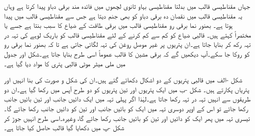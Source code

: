 جہاں مقناطیسی قالب میں بدلتا مقناطیسی بہاو ثانوی لچھوں میں فائدہ مند برقی دباو پیدا کرتا ہے وہاں یہ مقناطیسی قالب میں نقصان دہ برقی دباو کو بھی جنم دیتا ہے جس سے مقناطیسی قالب میں  پیدا ہوتا ہے۔ بھنور نما برقی رو مقناطیسی قالب میں برقی طاقت کے ضیاع کا سبب بنتا ہے جسے   یا  مختصراً  کہتے ہیں۔ قالبی ضیاع کو کم سے کم کرنے کے لئے مقناطیسی قالب کو  باریک لوہے کی  تہہ در تہہ رکھ کر بنایا جاتا ہے۔ان پتریوں پر غیر موصل روغن کی تہہ لگائی جاتی ہے تا کہ بھنور نما برقی رو کو روکا جا سکے۔آپ دیکھیں گے کہ برقی مشین کا قالب عموماً اسی طرح بنایا جاتا ہے۔شکل  اور جدول   میں  ملی میٹر موٹی  قالبی پتری کا  مواد دیا گیا ہے۔

شکل -الف میں قالبی پتریوں کے دو اشکال دکھائے گئے ہیں۔ان کی شکل و صورت کی بنا انہیں  اور   پتریاں پکارتے ہیں۔ شکل -ب میں ایک پتریوں اور تین پتریوں   کو دو طرح آپس میں رکھا گیا ہے۔ان دو طریقوں سے انہیں تہہ در تہہ رکھا جاتا ہے۔لہٰذا اگر پہلی تہہ میں ایک دائیں جانب اور تین بائیں جانب رکھا جائے تو اس کے اوپر دوسری تہہ میں ایک کو بائیں جانب اور تین کو دائیں جانب رکھا جائے گا۔تیسری تہہ میں پھر ایک کو دائیں اور تین کو بائیں جانب رکھا جائے گا، وغیرہ۔اسی طرح انہیں جوڑ کر شکل -پ میں دکھایا گیا قالب حاصل کیا جاتا ہے۔

